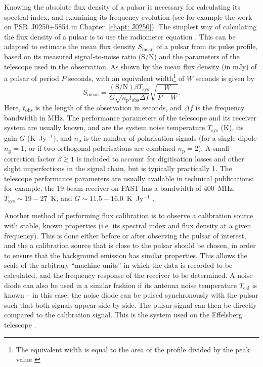 Knowing the absolute flux density of a pulsar is necessary for calculating its spectral index, and examining its frequency evolution (see for example the work on PSR~J0250+5854 in Chapter~\ref{chapt: J0250}).
The simplest way of calculating the flux density of a pulsar is to use the radiometer equation \citep{Dxxx1946}. This can be adapted to estimate the mean flux density $S_\mathrm{mean}$ of a pulsar from its pulse profile, based on its measured signal-to-noise ratio (S/N) and the parameters of the telescope used in the observation. As shown by \citet{Handbook} the mean flux density (in mJy) of a pulsar of period $P$ seconds, with an equivalent width\footnote{The equivalent width is equal to the area of the profile divided by the peak value \citep[e.g.][]{TMxx1975}} of $W$ seconds is given by
\begin{equation}
    \label{eq: intro - pulsar radiometer equation}
    S_\mathrm{mean} = \frac{(\mathrm{S/N}) \beta T_\mathrm{sys}}{G\sqrt{n_\mathrm{p}t_\mathrm{obs}\Delta f}}\sqrt{\frac{W}{P-W}}.
\end{equation}
Here, $t_\mathrm{obs}$ is the length of the observation in seconds, and $\Delta f$ is the frequency bandwidth in MHz. The performance parameters of the telescope and its receiver system are usually known, and are the system noise temperature $T_\mathrm{sys}$ (K), its gain $G$ (K~Jy$^{-1}$), and $n_\mathrm{p}$ is the number of polarisation signals (for a single dipole $n_\mathrm{p} = 1$, or if two orthogonal polarisations are combined $n_\mathrm{p} = 2$). A small correction factor $\beta \gtrsim 1$ is included to account for digitisation losses and other slight imperfections in the signal chain, but is typically practically 1. The telescope performance parameters are usually available in technical publications: for example, the 19-beam receiver on FAST has a bandwidth of 400~MHz, $T_\mathrm{sys} \sim 19 - 27$~K, and $G\sim 11.5 - 16.0$~K~Jy$^{-1}$ \citep{JTH+2020}.

Another method of performing flux calibration is to observe a calibration source with stable, known properties (i.e. its spectral index and flux density at a given frequency). This is done either before or after observing the pulsar of interest, and the a calibration source that is close to the pulsar should be chosen, in order to ensure that the background emission has similar properties. This allows the scale of the arbitrary ``machine units'' in which the data is recorded to be calculated, and the frequency response of the receiver to be determined. A noise diode can also be used in a similar fashion if its antenna noise temperature $T_\mathrm{cal}$ is known -- in this case, the noise diode can be pulsed synchronously with the pulsar such that both signals appear side by side. The pulsar signal can then be directly compared to the calibration signal. This is the system used on the Effelsberg telescope \citep{SGG+1995}.







